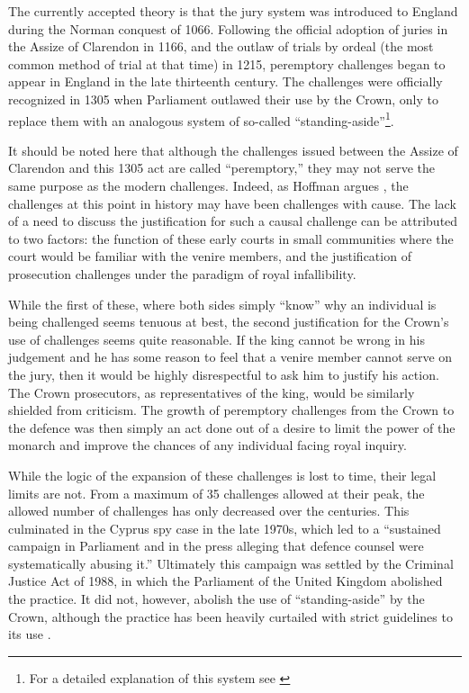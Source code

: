 The currently accepted theory is that the jury system was introduced to England during the Norman conquest of 1066. Following
the official adoption of juries in the Assize of Clarendon in 1166, and the outlaw of trials by ordeal (the most common method of
trial at that time) in 1215, peremptory challenges began to appear in England in the late thirteenth century. The challenges were
officially recognized in 1305 when Parliament outlawed their use by the Crown, only to replace them with an analogous system of
so-called ``standing-aside''\footnote{For a detailed explanation of this system see \cite{hoffman1997}}.

It should be noted here that although the challenges issued between the Assize of Clarendon and this 1305 act are called
``peremptory,'' they may not serve the same purpose as the modern challenges. Indeed, as Hoffman argues \cite{hoffman1997}, the
challenges at this point in history may have been challenges with cause. The lack of a need to discuss the justification for such
a causal challenge can be attributed to two factors: the function of these early courts in small communities where the court would
be familiar with the venire members, and the justification of prosecution challenges under the paradigm of royal infallibility.

While the first of these, where both sides simply ``know'' why an individual is being challenged seems tenuous at best, the second
justification for the Crown's use of challenges seems quite reasonable. If the king cannot be wrong in his judgement and he has
some reason to feel that a venire member cannot serve on the jury, then it would be highly disrespectful to ask him to justify his
action. The Crown prosecutors, as representatives of the king, would be similarly shielded from criticism. The growth of
peremptory challenges from the Crown to the defence was then simply an act done out of a desire to limit the power of the monarch
and improve the chances of any individual facing royal inquiry. 

While the logic of the expansion of these challenges is lost to time, their legal limits are not. From a maximum of 35 challenges
allowed at their peak, the allowed number of challenges has only decreased over the centuries. This culminated in the Cyprus spy
case in the late 1970s, which led to a ``sustained campaign in Parliament and in the press alleging that defence counsel were
systematically abusing it.''\cite{hoffman1997} Ultimately this campaign was settled by the Criminal Justice Act of 1988, in which
the Parliament of the United Kingdom abolished the practice. It did not, however, abolish the use of ``standing-aside'' by the
Crown, although the practice has been heavily curtailed with strict guidelines to its use \cite{attgenguide}.

